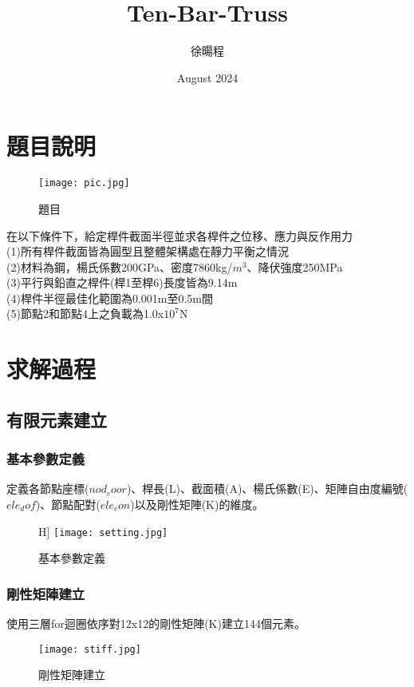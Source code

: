 \documentclass{article}
\title{Ten-Bar-Truss}
\author{徐暘程}
\date{August 2024}
\begin{document}
\begin{CJK}{UTF8}{bsmi}

\maketitle

\section{題目說明}
\begin{figure}[H]
    \centering
    \texttt{[image: pic.jpg]}
    \caption{題目}
    \label{fig:enter-label}
\end{figure}

在以下條件下，給定桿件截面半徑並求各桿件之位移、應力與反作用力\\
(1)所有桿件截面皆為圓型且整體架構處在靜力平衡之情況\\
(2)材料為鋼，楊氏係數200GPa、密度7860kg/$m^{3}$、降伏強度250MPa\\
(3)平行與鉛直之桿件(桿1至桿6)長度皆為9.14m\\
(4)桿件半徑最佳化範圍為0.001m至0.5m間\\
(5)節點2和節點4上之負載為1.0x$10^7$N\\


\section{求解過程}


    \subsection{有限元素建立}
    
        \subsubsection{基本參數定義}
        定義各節點座標($nod_coor$)、桿長(L)、截面積(A)、楊氏係數(E)、矩陣自由度編號($ele_dof$)、節點配對($ele_con$)以及剛性矩陣(K)的維度。
        \begin{figure}H]
            \centering
            \texttt{[image: setting.jpg]}
            \caption{基本參數定義}
            \label{fig:enter-label}
        \end{figure}
        
        \subsubsection{剛性矩陣建立}
        使用三層for迴圈依序對12x12的剛性矩陣(K)建立144個元素。
        \begin{figure}[H]
            \centering
            \texttt{[image: stiff.jpg]}
            \caption{剛性矩陣建立}
            \label{fig:enter-label}
        \end{figure}
        

\end{CJK}
\end{document}
